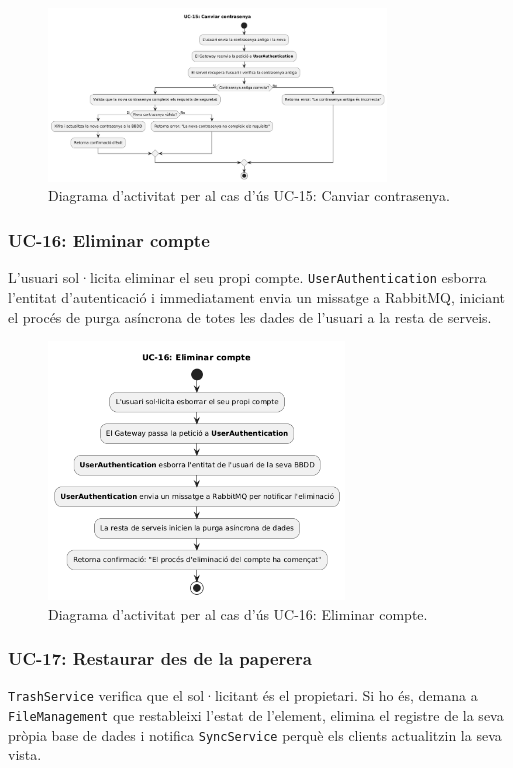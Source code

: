 \begin{figure}[H]
    \centering
    \includegraphics[width=0.8\textwidth]{Figures/ad_UC15.png}
    \caption{Diagrama d'activitat per al cas d'ús UC-15: Canviar contrasenya.}
    \label{fig:ad_uc15_app}
\end{figure}

\subsubsection{UC-16: Eliminar compte}
L'usuari sol·licita eliminar el seu propi compte. \texttt{UserAuthentication} esborra l'entitat d'autenticació i immediatament envia un missatge a RabbitMQ, iniciant el procés de purga asíncrona de totes les dades de l'usuari a la resta de serveis.

\begin{figure}[H]
    \centering
    \includegraphics[width=0.7\textwidth]{Figures/ad_UC16.png}
    \caption{Diagrama d'activitat per al cas d'ús UC-16: Eliminar compte.}
    \label{fig:ad_uc16_app}
\end{figure}

\subsubsection{UC-17: Restaurar des de la paperera}
\texttt{TrashService} verifica que el sol·licitant és el propietari. Si ho és, demana a \texttt{FileManagement} que restableixi l'estat de l'element, elimina el registre de la seva pròpia base de dades i notifica \texttt{SyncService} perquè els clients actualitzin la seva vista.

